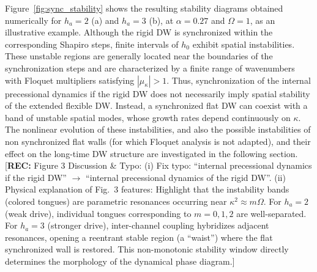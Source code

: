 \documentclass[prb,aps,twocolumn,superscriptaddress,floatfix]{revtex4-1}
\newcommand{\aleadd}[1]{{\color{blue}#1}}
\newcommand{\rec}[1]{{\color{magenta}[\textbf{REC:} #1]}}
\begin{document}
Figure~\ref{fig:sync_stability} shows the resulting stability diagrams obtained numerically for $h_a=2$ (a) and $h_a=3$ (b), at $\alpha=0.27$ and $\Omega=1$, as an illustrative example. Although the rigid DW is synchronized within the corresponding Shapiro steps, finite intervals of $h_0$ exhibit spatial instabilities. These unstable regions are generally located near the boundaries of the synchronization steps and are characterized by a finite range of wavenumbers with Floquet multipliers satisfying $|\mu_\kappa|>1$. Thus, synchronization of the internal precessional dynamics if the rigid DW does not necessarily imply spatial stability of the extended flexible DW. Instead, a synchronized flat DW can coexist with a band of unstable spatial modes, whose growth rates depend continuously on $\kappa$. The nonlinear evolution of these instabilities, \aleadd{and also the possible instabilities of non synchronized flat walls (for which Floquet analysis is not adapted)}, and their effect on the long-time DW structure are investigated in the following section.
\rec{Figure 3 Discussion \& Typo: (i) Fix typo: ``internal precessional dynamics if the rigid DW'' $\to$ ``internal precessional dynamics of the rigid DW''. (ii) Physical explanation of Fig.~3 features: Highlight that the instability bands (colored tongues) are parametric resonances occurring near $\kappa^2 \approx m\Omega$. For $h_a=2$ (weak drive), individual tongues corresponding to $m=0, 1, 2$ are well-separated. For $h_a=3$ (stronger drive), inter-channel coupling hybridizes adjacent resonances, opening a reentrant stable region (a ``waist'') where the flat synchronized wall is restored. This non-monotonic stability window directly determines the morphology of the dynamical phase diagram.}


\end{document}
